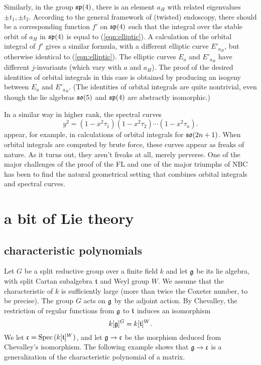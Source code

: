\documentclass[brochure,english,12pt]{bourbaki}
\def\op#1{{\operatorname{#1}}}
\def\so{\frak{so}}
\def\sp{\frak{sp}}
\def\g{\frak{g}}
\def\t{\frak{t}}
\def\cc{\frak{c}}
\begin{document}
Similarly, in the group $\sp(4)$, there is an element ${a_H}$ with related eigenvalues $\pm
t_1,\pm t_2$.  According to the general framework of (twisted) endoscopy, there
should be a corresponding function $f'$ on $\sp(4)$ such that the
integral over the stable orbit of ${a_H}$ in $\sp(4)$ is equal to
(\ref{eqn:elliptic}).  A calculation of the orbital integral of $f'$ gives a similar formula, with
a different elliptic curve $E'_{a_H}$, but otherwise identical to (\ref{eqn:elliptic}).
The elliptic curves $E_a$ and $E'_{a_H}$
have different $j$-invariants (which vary with $a$ and ${a_H}$).  The
proof of the desired identities of orbital integrals in this case is
obtained by producing an isogeny between $E_a$ and $E'_{a_H}$.  (The identities of orbital integrals are quite
nontrivial, even though the lie algebras $\so(5)$ and $\sp(4)$ are abstractly isomorphic.)

In a similar way in higher rank,  the spectral curves
\[
y^2 = (1-x^2 \tau_1)(1-x^2 \tau_2)\cdots (1-x^2 \tau_n).
\]
appear, for example, in calculations of orbital integrals for
$\so(2n+1)$.  When orbital integrals are computed by brute force,
these curves appear as freaks of nature.  As it turns
out, they aren't freaks at all, merely perverse.  One of the major
challenges of the proof of the FL and one of the major
triumphs of NBC has been to find the natural geometrical setting that combines
orbital integrals and spectral curves.

\section{a bit of Lie theory}



\subsection{characteristic polynomials}



Let $G$ be a split reductive group over a finite field $k$ and let
$\g$ be its lie algebra, with split Cartan subalgebra $\t$ and Weyl
group $W$.  We assume that the characteristic of $k$ is sufficiently
large (more than twice the Coxeter number, to be precise).  The group
$G$ acts on $\g$ by the adjoint action.  By Chevalley,  the restriction  of regular
functions from $\g$ to $\t$ induces an isomorphism
\[
k[\g]^G = k[\t]^W.
\]
We let $\cc =  \op{Spec}\,(k[\t]^W)$, and let $\g\to\cc$ be the morphism deduced from
Chevalley's isomorphism.  The following example shows that $\g\to\cc$ is a generalization
of the characteristic polynomial of a matrix.
\end{document}
